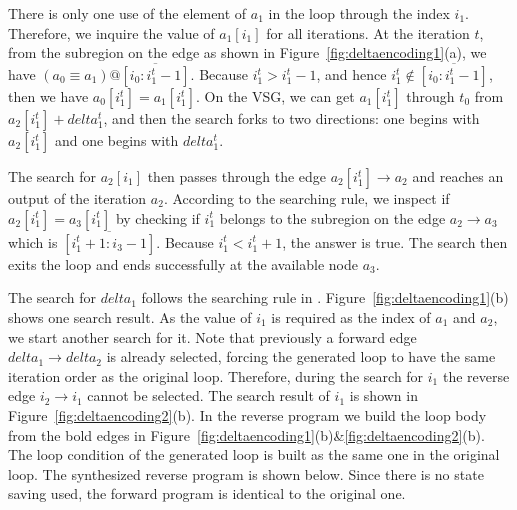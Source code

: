 There is only one use of the element of $a_1$ in the loop through the index $i_1$. 
Therefore, we inquire the value of $a_1[i_1]$ for all iterations.
At the iteration $t$, from the subregion on the edge  as shown in Figure~\ref{fig:deltaencoding1}(a), we have $(a_0\equiv a_1)@\overline{[i_0:i^t_1-1]}$.
Because $i_1^t > i^t_1-1$, and hence $i_1^t\notin \overline{[i_0:i^t_1-1]}$, then we have $a_0[i_1^t]= a_1[i_1^t]$.
On the VSG, we can get $a_1[i_1^t]$ through $t_0$ from $a_2[i_1^t]+delta_1^t$, and then the search forks to two directions:
one begins with $a_2[i_1^t]$ and one begins with $delta_1^t$.





The search for $a_2[i_1]$ then passes through the edge $a_2[i_1^t]\to a_2$ and reaches an output of the iteration $a_2$. 
According to the searching rule, we inspect if $a_2[i_1^t]=a_3[i_1^t]$ by checking if $i_1^t$ belongs to the subregion on the edge $a_2\to a_3$ which is $\overline{[i_1^t+1:i_3-1]}$. 
Because $i_1^t<i_1^t+1$, the answer is true.
The search then exits the loop  and ends successfully at the available node $a_3$.

The search for $delta_1$ follows the searching rule in \cite{HouRC}.
%
Figure~\ref{fig:deltaencoding1}(b) shows one search result. 
As the value of $i_1$ is required as the index of $a_1$ and $a_2$, we start another search for it.
Note that previously a forward edge $delta_1 \to delta_2$ is already selected, forcing the generated loop to have the same iteration order as the original loop. 
Therefore, during the search for $i_1$ the reverse edge $i_2\to i_1$ cannot be selected.
The search result of $i_1$ is shown in Figure~\ref{fig:deltaencoding2}(b).
In the reverse program we build the loop body from the bold edges in  Figure~\ref{fig:deltaencoding1}(b)\&\ref{fig:deltaencoding2}(b).
The loop condition of the generated loop is built as the same  one  in the original loop.
The synthesized reverse program is shown below.
Since there is no state saving used, the forward program is identical to the original one.


